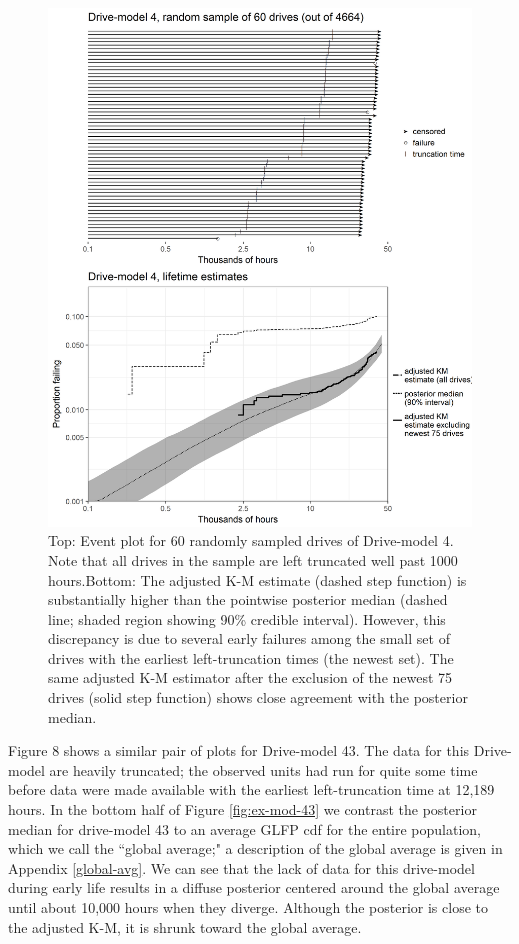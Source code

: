 \documentclass[12pt]{article}
\begin{document}
\begin{figure}
\centering
\includegraphics[height=.8\textheight]{dm4-exception.png}
\caption{\footnotesize Top: Event plot for 60 randomly sampled drives of Drive-model 4. Note that all drives in the sample are left truncated well past 1000 hours.\hspace{\textwidth}Bottom: The adjusted K-M estimate (dashed step function) is substantially higher than the pointwise posterior median (dashed line; shaded region showing 90\% credible interval). However, this discrepancy is due to several early failures among the small set of drives with the earliest left-truncation times (the newest set). The same adjusted K-M estimator after the exclusion of the newest 75 drives (solid step function) shows close agreement with the posterior median.}

\label{fig:ex-mod-4}
\end{figure}

Figure 8 shows a similar pair of plots for Drive-model 43. The data for this Drive-model are heavily truncated; the observed units had run for quite some time before data were made available with the earliest left-truncation time at 12,189 hours. In the bottom half of Figure \ref{fig:ex-mod-43} we contrast the posterior median for drive-model 43 to an average GLFP cdf for the entire population, which we call the ``global average;" a description of the global average is given in Appendix \ref{global-avg}. We can see that the lack of data for this drive-model during early life results in a diffuse posterior centered around the global average until about 10,000 hours when they diverge. Although the posterior is close to the adjusted K-M, it is shrunk toward the global average.
\end{document}
